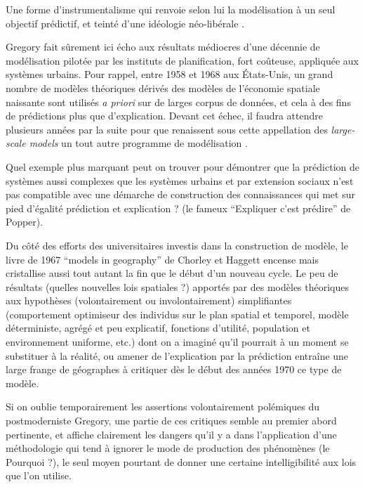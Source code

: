 Une forme d'instrumentalisme  qui renvoie selon lui la modélisation à un seul objectif prédictif, et teinté d'une idéologie néo-libérale .

Gregory fait sûrement ici écho aux résultats médiocres \autocite{Lee1973} d'une décennie de modélisation pilotée par les instituts de planification, fort coûteuse, appliquée aux systèmes urbains. Pour rappel, entre 1958 et 1968 aux États-Unis, un grand nombre de modèles théoriques \autocite[7-9]{Batty1979} dérivés des modèles de l'économie spatiale naissante sont utilisés \textit{a priori} sur de larges corpus de données, et cela à des fins de prédictions plus que d'explication. Devant cet échec, il faudra attendre plusieurs années par la suite pour que renaissent sous cette appellation des \textit{large-scale models} un tout autre programme de modélisation \autocite{Boyce1988}.

Quel exemple plus marquant peut on trouver pour démontrer que la prédiction de systèmes aussi complexes que les systèmes urbains et par extension sociaux n'est pas compatible avec une démarche de construction des connaissances qui met sur pied d'égalité prédiction et explication ? (le fameux \enquote{Expliquer c'est prédire} de Popper).

Du côté des efforts des universitaires investis dans la construction de modèle, le livre de 1967 \foreignquote{english}{models in geography} de Chorley et Haggett encense mais cristallise aussi \textcite{Golledge2006} tout autant la fin que le début d'un nouveau cycle. Le peu de résultats (quelles nouvelles lois spatiales ?) apportés par des modèles théoriques aux hypothèses (volontairement ou involontairement) simplifiantes (comportement optimiseur des individus sur le plan spatial et temporel, modèle déterministe, agrégé et peu explicatif, fonctions d'utilité, population et environnement uniforme, etc.) dont on a imaginé qu'il pourrait à un moment se substituer à la réalité, ou amener de l'explication par la prédiction \autocite[41]{Gregory1978} entraîne une large frange de géographes à critiquer dès le début des années 1970 ce type de modèle.

Si on oublie temporairement les assertions volontairement polémiques du postmoderniste Gregory, une partie de ces critiques semble au premier abord pertinente, et affiche clairement les dangers qu'il y a dans l'application d'une méthodologie qui tend à ignorer le mode de production des phénomènes (le Pourquoi ?), le seul moyen pourtant de donner une certaine intelligibilité aux lois que l'on utilise. \autocite[14-15]{Besse2000}

